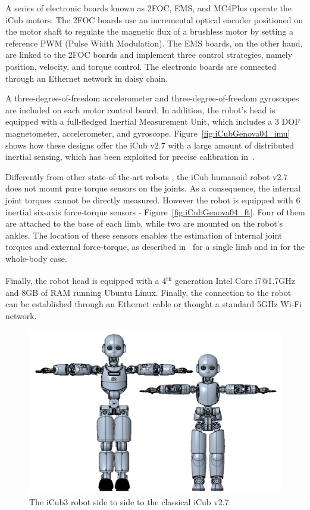 A series of electronic boards known as 2FOC, EMS, and MC4Plus operate the iCub motors. The 2FOC boards use an incremental optical encoder positioned on the motor shaft to regulate the magnetic flux of a brushless motor by setting a reference PWM (Pulse Width Modulation). The EMS boards, on the other hand, are linked to the 2FOC boards and implement three control strategies, namely position, velocity, and torque control. The electronic boards are connected through an Ethernet network in daisy chain.
\par
A three-degree-of-freedom accelerometer and three-degree-of-freedom gyroscopes are included on each motor control board. In addition, the robot's head is equipped with a full-fledged Inertial Measurement Unit, which includes a 3 DOF magnetometer, accelerometer, and gyroscope. Figure~\ref{fig:iCubGenova04_imu} shows how these designs offer the iCub v2.7 with a large amount of distributed inertial sensing, which has been exploited for precise calibration in~\citep{Guedelha2016Self-calibrationMeasurements}.
\par
Differently from other state-of-the-art robots \citep{Englsberger2015OverviewTORO,Stasse2017TALOS:Applications}, the iCub humanoid robot v2.7 does not mount pure torque sensors on the joints. As a consequence, the internal joint torques cannot be directly measured. However the robot is equipped with 6 inertial six-axis force-torque sensors - Figure~\ref{fig:iCubGenova04_ft}. Four of them are attached to the base of each limb, while two are mounted on the robot's ankles. The location of these sensors enables the estimation of internal joint torques and external force-torque, as described in~\citep{Fumagalli2012} for a single limb and in \citep[Chapter~4]{Traversaro2017ModellingDynamics} for the whole-body case.
\par
Finally, the robot head is equipped with a 4$^{\text{th}}$ generation Intel\textsuperscript{\textregistered} Core i7@1.7GHz and 8GB of RAM running Ubuntu Linux. Finally, the connection to the robot can be established through an Ethernet cable or thought a standard 5GHz Wi-Fi network.

\begin{figure}[t]
\centering
    \includegraphics[width=\textwidth]{chapter_introduction/figures/icub_comparison.png}
    \caption{The iCub3 robot side to side to the classical iCub v2.7.
    \label{fig:icub_comparison}}
\end{figure}


